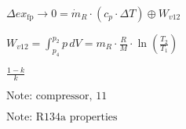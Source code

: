 \( \Delta ex_{\text{fp}} \to 0 = \dot{m}_{R} \cdot (c_p \cdot \Delta T) \oplus W_{v12} \)  

\( W_{v12} = \int_{p_4}^{p_2} p \, dV = m_R \cdot \frac{R}{M} \cdot \ln \left( \frac{T_2}{T_1} \right) \)  

\( \frac{1 - k}{k} \)  

\( \text{Note: } \text{compressor, 11} \)  

\( \text{Note: } \text{R134a properties} \)